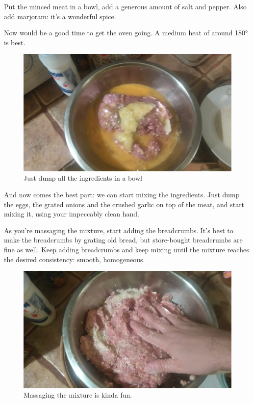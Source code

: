 \documentclass{article}
\begin{document}
Put the minced meat in a bowl, add a generous amount of salt and pepper. Also add marjoram: it's a wonderful spice.

Now would be a good time to get the oven going. A medium heat of around \ang{180} is best.

\begin{figure}[!htbp]
\includegraphics[width=\textwidth]{meatloaf_09}
\caption{Just dump all the ingredients in a bowl}
\end{figure}

And now comes the best part: we can start mixing the ingredients. Just dump the eggs, the grated onions and the crushed garlic on top of the meat, and start mixing it, using your impeccably clean hand.

As you're massaging the mixture, start adding the breadcrumbs. It's best to make the breadcrumbs by grating old bread, but store-bought breadcrumbs are fine as well. Keep adding breadcrumbs and keep mixing until the mixture reaches the desired consistency: smooth, homogeneous.

\begin{figure}[!htbp]
\includegraphics[width=\textwidth]{meatloaf_11}
\caption{Massaging the mixture is kinda fun.}
\end{figure}
\end{document}
